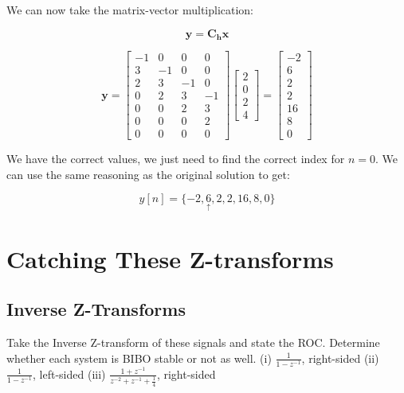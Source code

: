 \documentclass{article}
\begin{document}
\noindent We can now take the matrix-vector multiplication:

$$\mathbf{y} = \mathbf{C_hx}$$

$$\mathbf{y} = 
  \begin{bmatrix} 
  -1 & 0 & 0 & 0 \\
  3 & -1 & 0 & 0 \\
  2 & 3 & -1 & 0 \\
  0 & 2 & 3 & -1 \\
  0 & 0 & 2 & 3 \\
  0 & 0 & 0 & 2 \\
  0 & 0 & 0 & 0 
  \end{bmatrix}
  \begin{bmatrix}
  2 \\
  0 \\
  2 \\
  4
  \end{bmatrix}
  =
  \begin{bmatrix}
  -2 \\
  6 \\
  2 \\
  2 \\ 
  16 \\
  8 \\
  0
  \end{bmatrix}
$$

\noindent We have the correct values, we just need to find the correct index for $n=0$. We can use the same reasoning as the original solution to get:

$$y[n] = \{ -2, \underset{\uparrow}{6}, 2, 2, 16, 8, 0\}$$

\newpage

\section{Catching These Z-transforms}

\subsection{Inverse Z-Transforms}
Take the Inverse Z-transform of these signals and state the ROC. Determine whether each system is BIBO stable or not as well.
\newline\newline
(i) $\frac{1}{1-z^{-1}}$, right-sided
\newline\newline
(ii) $\frac{1}{1-z^{-1}}$, left-sided
\newline\newline
(iii) $\frac{1 + z^{-1}}{z^{-2} + z^{-1} + \frac{1}{4}}$, right-sided \newline
\end{document}
